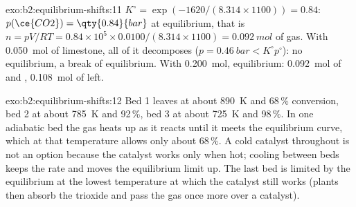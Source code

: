 \begin{solution}{exo:b2:equilibrium-shifts:11}
$K^\circ = \exp(-1620/(8.314 \times 1100)) = 0.84$: $p(\ce{CO2}) =
\qty{0.84}{bar}$ at equilibrium, that is $n = pV/RT = 0.84 \times 10^5 \times
0.0100/(8.314 \times 1100) = \qty{0.092}{mol}$ of gas. With \qty{0.050}{mol}
of limestone, all of it decomposes ($p = \qty{0.46}{bar} < K^\circ p^\circ$):
no equilibrium, a break of equilibrium. With \qty{0.200}{mol}, equilibrium:
\qty{0.092}{mol} of  and , \qty{0.108}{mol} of  left.
\end{solution}

\begin{solution}{exo:b2:equilibrium-shifts:12}
Bed 1 leaves at about \qty{890}{K} and 68\,\% conversion, bed 2 at about
\qty{785}{K} and 92\,\%, bed 3 at about \qty{725}{K} and 98\,\%. In one
adiabatic bed the gas heats up as it reacts until it meets the equilibrium
curve, which at that temperature allows only about 68\,\%. A cold catalyst
throughout is not an option because the catalyst works only when hot; cooling
between beds keeps the rate and moves the equilibrium limit up. The last bed
is limited by the equilibrium at the lowest temperature at which the catalyst
still works (plants then absorb the trioxide and pass the gas once more over
a catalyst).
\end{solution}

